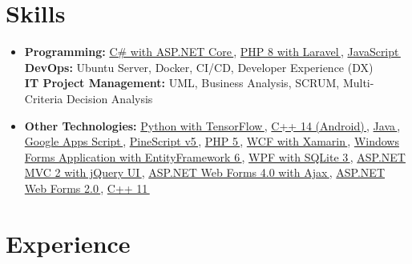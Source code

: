 \documentclass[11pt,a4paper]{article}
\let\orighref\href
\renewcommand{\href}[2]{\orighref{#1}{#2\,{\textsuperscript{\tiny{\faExternalLink}}}}}
\begin{document}
\begin{justify}


\section{Skills}
 \begin{itemize}[leftmargin=0.15in, label={}]
    \item {
        \textbf{Programming:}
        \href{https://github.com/tayyebi/TehranStocks}{C\# with ASP.NET Core},
        \href{https://github.com/tayyebi/rest-api-laravel-swagger-practice}{PHP 8 with Laravel},
        \href{https://github.com/tayyebi/textyy}{JavaScript}
        \\
        \textbf{DevOps:}
        {Ubuntu Server},
        {Docker},
        {CI/CD},
        {Developer Experience (DX)}
        \\
        \textbf{IT Project Management:}
        {UML},
        {Business Analysis},
        {SCRUM},
        {Multi-Criteria Decision Analysis}
    }
    \item{
         \textbf{Other Technologies:}\small{
         \href{https://github.com/tayyebi/NlpSemanticAnalysis}{Python with TensorFlow},
         \href{https://github.com/tayyebi/Baqemboogh}{C++ 14 (Android)},
         \href{https://github.com/tayyebi/Checkeh}{Java},         \href{https://gist.github.com/tayyebi/927aee5787ba45b3ab0fd637bedfd653}{Google Apps Script},
         \href{https://www.tradingview.com/u/tayyebi}{PineScript v5},
         \href{https://github.com/Gordarg/SF}{PHP 5},
         \href{https://github.com/tayyebi/Dr-Hesaabi-KhajeNasirAccountingSystem}{WCF with Xamarin},
         \href{https://github.com/tayyebi/TuneMax}{Windows Forms Application with EntityFramework 6},
         \href{https://github.com/tayyebi/humancapitals}{WPF with SQLite 3},
         \href{https://github.com/tayyebi/TuneMax}{ASP.NET MVC 2 with jQuery UI},
         \href{https://github.com/tayyebi/SnowCity}{ASP.NET Web Forms 4.0 with Ajax},
         \href{https://github.com/tayyebi/HQCMA}{ASP.NET Web Forms 2.0},
         \href{https://gist.github.com/tayyebi/da6a754e3af0553b897f9237248dafcc}{C++ 11}
         }
    }
     
 \end{itemize}

\section{Experience}


\end{justify}
\end{document}
